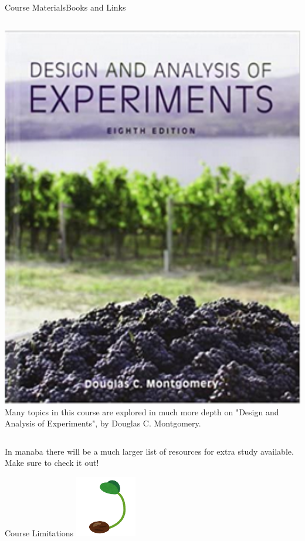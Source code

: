 \documentclass{beamer}
\begin{document}
\begin{CJK}{UTF8}{ipxm}
\begin{frame}{Course Materials}{Books and Links}
  \begin{columns}
    \includegraphics[width=1\textwidth]{../img/DesignAnalysis_book}
    Many topics in this course are explored in much more depth on "Design and Analysis of Experiments", by Douglas C. Montgomery.
  \end{columns}
  \vspace{1cm}

  In manaba there will be a much larger list of resources for
  extra study available. Make sure to check it out!
\end{frame}

\begin{frame}{Course Limitations}
  \hfill\includegraphics[width=0.2\textwidth]{../img/irasuto_sprout}
  \\


\end{frame}
\end{CJK}
\end{document}
